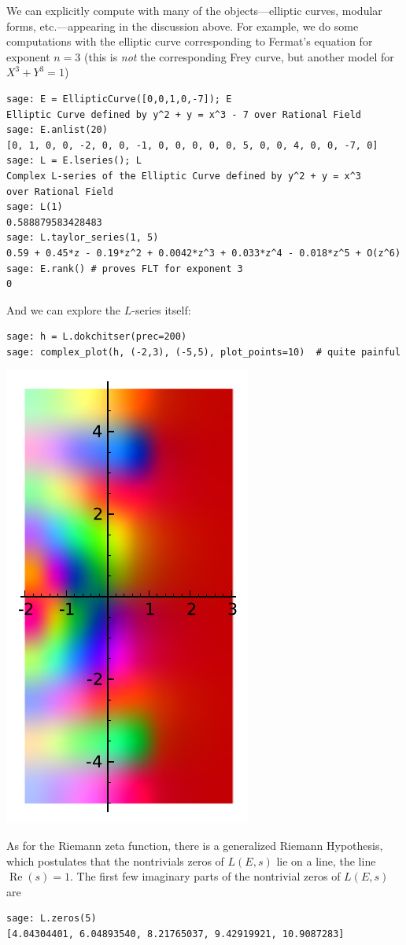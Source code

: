 \documentclass{book}
\theoremstyle{plain}
\theoremstyle{definition}
\numberwithin{equation}{section}
\numberwithin{figure}{section}
\numberwithin{table}{section}
\DeclareMathOperator{\realpart}{Re}
\renewcommand{\Re}{\realpart}
\begin{document}
We can explicitly compute with many of the
objects---elliptic curves, modular forms, etc.---appearing
in the discussion above.
For example, we do some computations with the elliptic
curve corresponding to Fermat's equation for exponent $n=3$
(this is {\em not} the corresponding Frey curve, but another
model for $X^3+Y^3=1$)
\begin{lstlisting}
sage: E = EllipticCurve([0,0,1,0,-7]); E
Elliptic Curve defined by y^2 + y = x^3 - 7 over Rational Field
sage: E.anlist(20)
[0, 1, 0, 0, -2, 0, 0, -1, 0, 0, 0, 0, 0, 5, 0, 0, 4, 0, 0, -7, 0]
sage: L = E.lseries(); L
Complex L-series of the Elliptic Curve defined by y^2 + y = x^3
over Rational Field
sage: L(1)
0.588879583428483
sage: L.taylor_series(1, 5)
0.59 + 0.45*z - 0.19*z^2 + 0.0042*z^3 + 0.033*z^4 - 0.018*z^5 + O(z^6)
sage: E.rank() # proves FLT for exponent 3
0
\end{lstlisting}
And we can explore the $L$-series itself:
\begin{lstlisting}
sage: h = L.dokchitser(prec=200)
sage: complex_plot(h, (-2,3), (-5,5), plot_points=10)  # quite painful
\end{lstlisting}

\begin{center}
\includegraphics[width=.4\textwidth]{pics/27a-lser1.pdf}
\end{center}

As for the Riemann zeta function, there is a generalized Riemann
Hypothesis, which postulates that the nontrivials zeros of
$L(E,s)$ lie on a line, the line $\Re(s)=1$.
The first few imaginary parts of the nontrivial zeros of $L(E,s)$ are
\begin{lstlisting}
sage: L.zeros(5)
[4.04304401, 6.04893540, 8.21765037, 9.42919921, 10.9087283]
\end{lstlisting}
\end{document}
